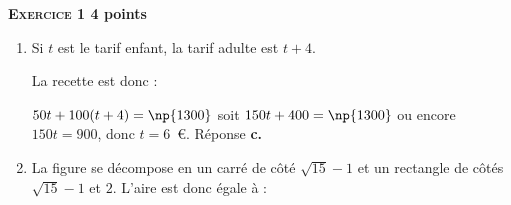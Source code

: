 \textbf{\textsc{Exercice 1} \hfill 4 points}

\medskip

%

\begin{enumerate}
\item %


%
Si $t$ est le tarif enfant, la tarif adulte est $t + 4$.

La recette est donc :

$50t + 100 (t + 4) = \np{1300}$ soit $150t + 400 = \np{1300}$ ou encore $150t = 900$, donc $t = 6$~\euro. Réponse \textbf{c.}
\item %

 
%
La figure se décompose en un carré de côté $\sqrt{15}  - 1$ et un rectangle de côtés $\sqrt{15}  - 1$ et $2$. L'aire est donc égale à :


\end{enumerate}
